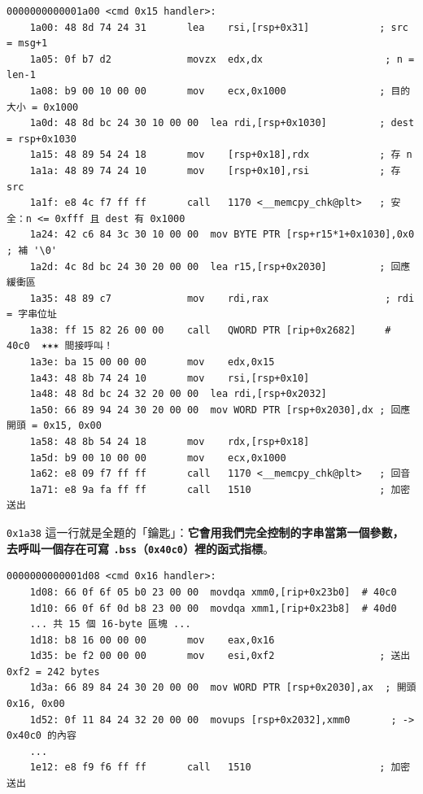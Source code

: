 \documentclass[10pt,a4paper]{article}
\begin{document}
\begin{Verbatim}[breaklines=true,breakanywhere=true,breakautoindent=false,fontsize=\fontsize{7.0}{9.5}\selectfont]
0000000000001a00 <cmd 0x15 handler>:
    1a00: 48 8d 74 24 31       lea    rsi,[rsp+0x31]            ; src = msg+1
    1a05: 0f b7 d2             movzx  edx,dx                     ; n = len-1
    1a08: b9 00 10 00 00       mov    ecx,0x1000                ; 目的大小 = 0x1000
    1a0d: 48 8d bc 24 30 10 00 00  lea rdi,[rsp+0x1030]         ; dest = rsp+0x1030
    1a15: 48 89 54 24 18       mov    [rsp+0x18],rdx            ; 存 n
    1a1a: 48 89 74 24 10       mov    [rsp+0x10],rsi            ; 存 src
    1a1f: e8 4c f7 ff ff       call   1170 <__memcpy_chk@plt>   ; 安全：n <= 0xfff 且 dest 有 0x1000
    1a24: 42 c6 84 3c 30 10 00 00  mov BYTE PTR [rsp+r15*1+0x1030],0x0  ; 補 '\0'
    1a2d: 4c 8d bc 24 30 20 00 00  lea r15,[rsp+0x2030]         ; 回應緩衝區
    1a35: 48 89 c7             mov    rdi,rax                    ; rdi = 字串位址
    1a38: ff 15 82 26 00 00    call   QWORD PTR [rip+0x2682]     # 40c0  ✶✶✶ 間接呼叫！
    1a3e: ba 15 00 00 00       mov    edx,0x15
    1a43: 48 8b 74 24 10       mov    rsi,[rsp+0x10]
    1a48: 48 8d bc 24 32 20 00 00  lea rdi,[rsp+0x2032]
    1a50: 66 89 94 24 30 20 00 00  mov WORD PTR [rsp+0x2030],dx ; 回應開頭 = 0x15, 0x00
    1a58: 48 8b 54 24 18       mov    rdx,[rsp+0x18]
    1a5d: b9 00 10 00 00       mov    ecx,0x1000
    1a62: e8 09 f7 ff ff       call   1170 <__memcpy_chk@plt>   ; 回音
    1a71: e8 9a fa ff ff       call   1510                      ; 加密送出
\end{Verbatim}

\texttt{0x1a38}
這一行就是全題的「鑰匙」：\textbf{它會用我們完全控制的字串當第一個參數，
去呼叫一個存在可寫 \texttt{.\allowbreak{}bss}（\texttt{0x40c0}）裡的函式指標}。

\begin{Verbatim}[breaklines=true,breakanywhere=true,breakautoindent=false,fontsize=\fontsize{7.0}{9.5}\selectfont]
0000000000001d08 <cmd 0x16 handler>:
    1d08: 66 0f 6f 05 b0 23 00 00  movdqa xmm0,[rip+0x23b0]  # 40c0
    1d10: 66 0f 6f 0d b8 23 00 00  movdqa xmm1,[rip+0x23b8]  # 40d0
    ... 共 15 個 16-byte 區塊 ...
    1d18: b8 16 00 00 00       mov    eax,0x16
    1d35: be f2 00 00 00       mov    esi,0xf2                  ; 送出 0xf2 = 242 bytes
    1d3a: 66 89 84 24 30 20 00 00  mov WORD PTR [rsp+0x2030],ax  ; 開頭 0x16, 0x00
    1d52: 0f 11 84 24 32 20 00 00  movups [rsp+0x2032],xmm0       ; -> 0x40c0 的內容
    ...
    1e12: e8 f9 f6 ff ff       call   1510                      ; 加密送出
\end{Verbatim}
\end{document}
